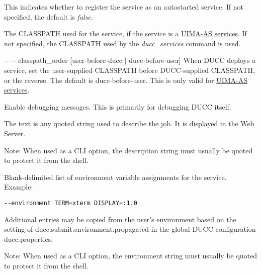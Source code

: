     \begin{description}

        \item[$--$autostart {[true or false]}] This indicates whether to register the service as
          an autostarted service.  If not specified, the default is {\em false}.

        \item[$--$classpath] The CLASSPATH used for the service, if the service is a
          \hyperref[sec:services.types]{UIMA-AS services}.  If not specified, the CLASSPATH used
          by the {\em ducc\_services} command is used.

        \begin{sloppypar}
        \item[$--$classpath\_order {[user-before-ducc $|$ ducc-before-user]} ] When DUCC deploys a service,
          set the user-supplied CLASSPATH before DUCC-supplied CLASSPATH, or the reverse. 
          The default is ducc-before-user. This is
          only valid for  \hyperref[sec:services.types]{UIMA-AS services}.
        \end{sloppypar}
        
        \item[$--$debug ]
          Enable debugging messages. This is primarily for debugging DUCC itself. 
          
        \item[$--$description {[text]}] The text is any quoted string used to describe the job. It is
          displayed in the Web Server.

          Note: When used as a CLI option, the description string must usually be quoted to protect
          it from the shell.
    
        \item[$--$environment {[env vars]}] Blank-delimited list of environment variable
          assignments for the service. Example:
          \begin{verbatim}
--environment TERM=xterm DISPLAY=:1.0
          \end{verbatim}

          \begin{sloppypar}
          Additional entries may be copied from the user's environment based on the setting of
          ducc.submit.environment.propagated in the global DUCC configuration ducc.properties.
        \end{sloppypar}
        
          Note: When used as a CLI option, the environment string must usually be
          quoted to protect it from the shell.
          

\end{description}
